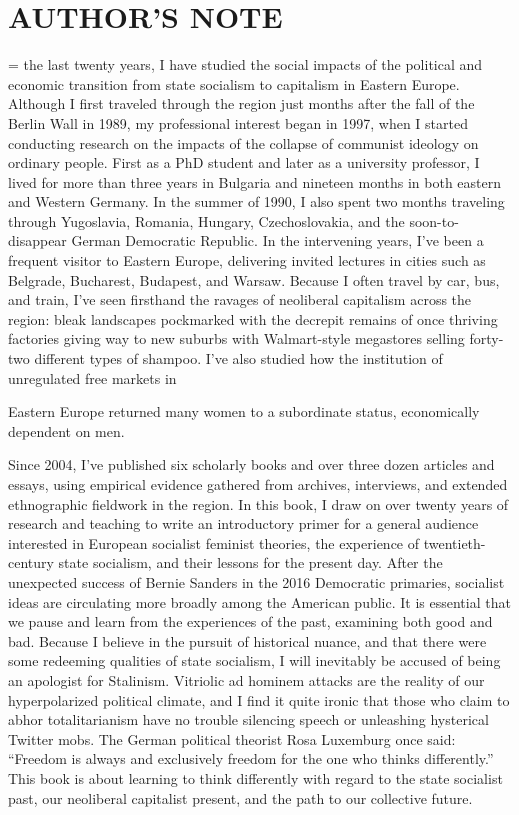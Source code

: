 \chapter{AUTHOR'S NOTE}\label{AUTHOR'S NOTE}
 \par 
= the last twenty years, I have studied the social impacts of the political and economic transition from state socialism to capitalism in Eastern Europe. Although I first traveled through the region just months after the fall of the Berlin Wall in 1989, my professional interest began in 1997, when I started conducting research on the impacts of the collapse of communist ideology on ordinary people. First as a PhD student and later as a university professor, I lived for more than three years in Bulgaria and nineteen months in both eastern and Western Germany. In the summer of 1990, I also spent two months traveling through Yugoslavia, Romania, Hungary, Czechoslovakia, and the soon-to-disappear German Democratic Republic. In the intervening years, I’ve been a frequent visitor to Eastern Europe, delivering invited lectures in cities such as Belgrade, Bucharest, Budapest, and Warsaw. Because I often travel by car, bus, and train, I’ve seen firsthand the ravages of neoliberal capitalism across the region: bleak landscapes pockmarked with the decrepit remains of once thriving factories giving way to new suburbs with Walmart-style megastores selling forty-two different types of shampoo. I’ve also studied how the institution of unregulated free markets in
 \par 
Eastern Europe returned many women to a subordinate status, economically dependent on men.
 \par 
Since 2004, I’ve published six scholarly books and over three dozen articles and essays, using empirical evidence gathered from archives, interviews, and extended ethnographic fieldwork in the region. In this book, I draw on over twenty years of research and teaching to write an introductory primer for a general audience interested in European socialist feminist theories, the experience of twentieth-century state socialism, and their lessons for the present day. After the unexpected success of Bernie Sanders in the 2016 Democratic primaries, socialist ideas are circulating more broadly among the American public. It is essential that we pause and learn from the experiences of the past, examining both good and bad. Because I believe in the pursuit of historical nuance, and that there were some redeeming qualities of state socialism, I will inevitably be accused of being an apologist for Stalinism. Vitriolic ad hominem attacks are the reality of our hyperpolarized political climate, and I find it quite ironic that those who claim to abhor totalitarianism have no trouble silencing speech or unleashing hysterical Twitter mobs. The German political theorist Rosa Luxemburg once said: “Freedom is always and exclusively freedom for the one who thinks differently.” This book is about learning to think differently with regard to the state socialist past, our neoliberal capitalist present, and the path to our collective future.
